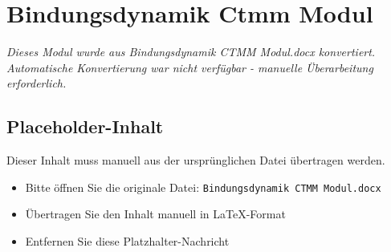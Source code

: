 
\section{Bindungsdynamik Ctmm Modul}
\label{sec:bindungsdynamik-ctmm-modul}

\begin{center}
\textit{Dieses Modul wurde aus Bindungsdynamik CTMM Modul.docx konvertiert.\\
Automatische Konvertierung war nicht verfügbar - manuelle Überarbeitung erforderlich.}
\end{center}


\subsection{Placeholder-Inhalt}

Dieser Inhalt muss manuell aus der ursprünglichen Datei übertragen werden.

\begin{itemize}
\item Bitte öffnen Sie die originale Datei: \texttt{Bindungsdynamik CTMM Modul.docx}
\item Übertragen Sie den Inhalt manuell in LaTeX-Format
\item Entfernen Sie diese Platzhalter-Nachricht
\end{itemize}
